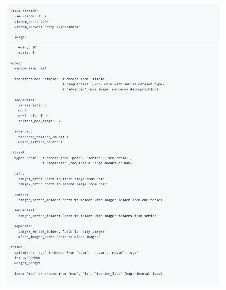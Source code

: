 \begin{appendices}
\begin{figure}[h]
	\centering
	\includegraphics[width=\textwidth]{img/markdown/README_2}
	\label{fig:markdown_2}
\end{figure}


\end{appendices}
